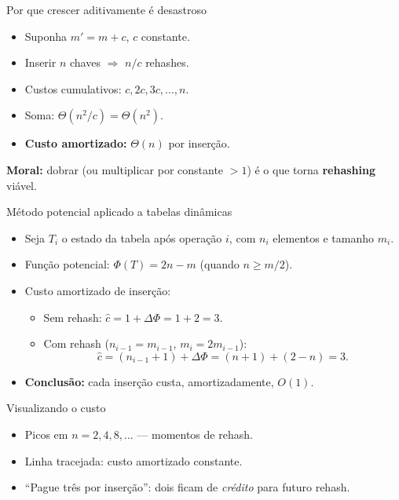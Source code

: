 \documentclass[aspectratio=169]{beamer}
\begin{document}
\begin{frame}{Por que crescer aditivamente é desastroso}
\begin{itemize}
    \item Suponha $m' = m + c$, $c$ constante.
    \item Inserir $n$ chaves $\Rightarrow$ $n/c$ rehashes.
    \item Custos cumulativos: $c, 2c, 3c, \dots, n$.
    \item Soma: $\Theta(n^2/c) = \Theta(n^2)$.
    \item \textbf{Custo amortizado:} $\Theta(n)$ por inserção.
\end{itemize}
\bigskip
\textbf{Moral:} dobrar (ou multiplicar por constante $> 1$) é o que torna
\textbf{rehashing} viável.
\end{frame}

\begin{frame}{Método potencial aplicado a tabelas dinâmicas}
\begin{itemize}
    \item Seja $T_i$ o estado da tabela após operação $i$, com $n_i$ elementos e
    tamanho $m_i$.
    \item Função potencial: $\Phi(T) = 2 n - m$ (quando $n \geq m/2$).
    \item Custo amortizado de inserção:
    \begin{itemize}
        \item Sem rehash: $\hat c = 1 + \Delta \Phi = 1 + 2 = 3$.
        \item Com rehash ($n_{i-1} = m_{i-1}$, $m_i = 2 m_{i-1}$):
        \[
        \hat c = (n_{i-1} + 1) + \Delta \Phi = (n+1) + (2 - n) = 3.
        \]
    \end{itemize}
    \item \textbf{Conclusão:} cada inserção custa, amortizadamente, $O(1)$.
\end{itemize}
\end{frame}

\begin{frame}{Visualizando o custo}
\begin{center}
\end{center}
\begin{itemize}
    \item Picos em $n = 2, 4, 8, \dots$ — momentos de rehash.
    \item Linha tracejada: custo amortizado constante.
    \item ``Pague três por inserção'': dois ficam de \emph{crédito} para futuro rehash.
\end{itemize}
\end{frame}
\end{document}
